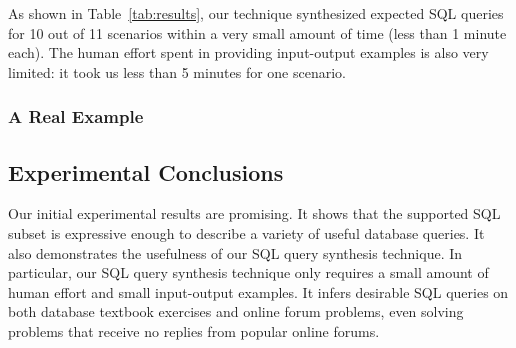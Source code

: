 As shown in Table~\ref{tab:results}, our technique synthesized
expected SQL queries for 10 out of 11 scenarios
within a very small amount of time (less than 1 minute each).
The human effort spent in providing input-output examples
is also very limited: it took us less than 5 minutes for one scenario.


\subsubsection{A Real Example}


\subsection{Experimental Conclusions}

Our initial experimental results are promising.
It shows that the supported SQL subset is
expressive enough to describe a variety of useful database queries.
It also demonstrates the usefulness of our SQL query
synthesis technique.  In particular, our SQL query synthesis technique only requires a small amount of
human effort and small input-output examples. It infers 
desirable SQL queries on both database textbook exercises
and online forum problems, even solving problems that receive no replies from popular online forums.




